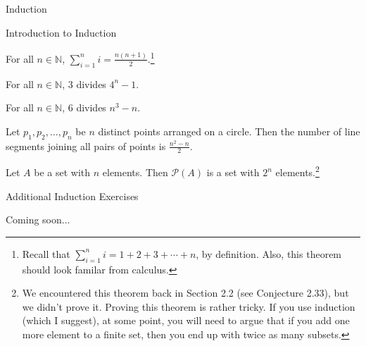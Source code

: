 \begin{chapter}{Induction}
\begin{section}{Introduction to Induction}
\begin{skeleton}
\end{skeleton}

\begin{theorem}
For all $n\in\mathbb{N}$, $\displaystyle \sum_{i=1}^{n}i=\frac{n(n+1)}{2}$.\footnote{Recall that $\displaystyle \sum_{i=1}^{n}i=1+2+3+\cdots +n$, by definition.  Also, this theorem should look familar from calculus.}
\end{theorem}

\begin{theorem}
For all $n\in\mathbb{N}$, 3 divides $4^{n}-1$.
\end{theorem}

\begin{theorem}
For all $n\in\mathbb{N}$, 6 divides $n^{3}-n$.
\end{theorem}

\begin{theorem}
Let $p_{1}, p_{2}, \ldots, p_{n}$ be $n$ distinct points arranged on a circle.  Then the number of line segments joining all pairs of points is $\frac{n^{2}-n}{2}$.
\end{theorem}

\begin{theorem}
Let $A$ be a set with $n$ elements.  Then $\mathcal{P}(A)$ is a set with $2^{n}$ elements.\footnote{We encountered this theorem back in Section 2.2 (see Conjecture 2.33), but we didn't prove it.  Proving this theorem is rather tricky.  If you use induction (which I suggest), at some point, you will need to argue that if you add one more element to a finite set, then you end up with twice as many subsets.}
\end{theorem}

\end{section}

\begin{section}{Additional Induction Exercises}

Coming soon...

\end{section}

\end{chapter}